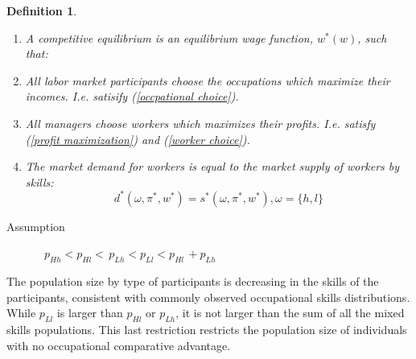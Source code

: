 \documentclass[12 pt]{article}
\newtheorem{definition}{Definition}
\begin{document}
\begin{definition}
	\begin{enumerate}
		Let $P(M,w)$ be the population supply of skills.
		
		\item A competitive equilibrium is an equilibrium wage function, $w^{\ast}%
		(w)$, such that:
		
		\item All labor market participants choose the occupations which maximize
		their incomes. I.e. satisify (\ref{occpational choice}).
		
		\item All managers choose workers which maximizes their profits. I.e. satisfy
		(\ref{profit maximization}) and (\ref{worker choice}).
		
		\item The market demand for workers is equal to the market supply of workers
		by skills:%
		\begin{equation}
			d^{\ast}(\omega,\pi^{\ast},w^{\ast})=s^{\ast}(\omega,\pi^{\ast},w^{\ast
			}),\omega=\{h,l\} \label{market equilibrium}%
		\end{equation}
		
	\end{enumerate}
\end{definition}

\begin{description}
	\item[Assumption] \label{3}\bigskip\ $p_{Hh}<p_{Hl}<\,p_{Lh}<p_{Ll}%
	<p_{Hl}\,+p_{Lh}$
\end{description}

The population size by type of participants is decreasing in the skills of the
participants, consistent with commonly observed occupational skills
distributions. While $p_{Ll}$ is larger than $p_{Hl}$ or $p_{Lh}$, it is not
larger than the sum of all the mixed skills populations. This last restriction
restricts the population size of individuals with no occupational comparative advantage.
	
	

	
	\newpage
	
	
	
\end{document}
